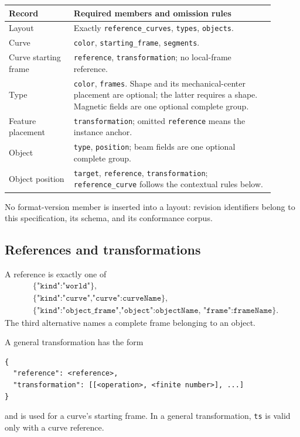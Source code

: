 \documentclass[11pt,a4paper]{article}
\begin{document}
\begin{center}
\small
\begin{tabular}{p{0.22\linewidth}p{0.68\linewidth}}
\toprule
Record & Required members and omission rules \\
\midrule
Layout & Exactly \texttt{reference\_curves}, \texttt{types}, \texttt{objects}. \\
Curve & \texttt{color}, \texttt{starting\_frame}, \texttt{segments}. \\
Curve starting frame & \texttt{reference}, \texttt{transformation}; no local-frame reference. \\
Type & \texttt{color}, \texttt{frames}. Shape and its mechanical-center placement are optional; the latter requires a shape. Magnetic fields are one optional complete group. \\
Feature placement & \texttt{transformation}; omitted \texttt{reference} means the instance anchor. \\
Object & \texttt{type}, \texttt{position}; beam fields are one optional complete group. \\
Object position & \texttt{target}, \texttt{reference}, \texttt{transformation}; \texttt{reference\_curve} follows the contextual rules below. \\
\bottomrule
\end{tabular}
\end{center}

No format-version member is inserted into a layout: revision identifiers
belong to this specification, its schema, and its conformance corpus.

\subsection{References and transformations}

A reference is exactly one of
\begin{align*}
 &\texttt{\{"kind":"world"\}},\\
 &\texttt{\{"kind":"curve","curve":curveName\}},\\
 &\texttt{\{"kind":"object\_frame","object":objectName,
             "frame":frameName\}}.
\end{align*}
The third alternative names a complete frame belonging to an object.

A general transformation has the form
\begin{lstlisting}
{
  "reference": <reference>,
  "transformation": [[<operation>, <finite number>], ...]
}
\end{lstlisting}
and is used for a curve's starting frame.  In a general transformation,
\texttt{ts} is valid only with a curve reference.
\end{document}
